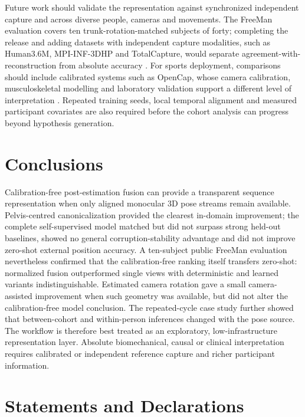 \documentclass[lineno,pdflatex,sn-mathphys-num]{sn-jnl}
\begin{document}
Future work should validate the representation against synchronized
independent capture and across diverse people, cameras and movements. The
FreeMan evaluation covers ten trunk-rotation-matched subjects of forty;
completing the release and adding datasets with independent capture
modalities, such as Human3.6M, MPI-INF-3DHP and TotalCapture, would separate
agreement-with-reconstruction from absolute accuracy
\cite{Ionescu2014Human36M,Mehta2017MPIINF3DHP,Trumble2017TotalCapture}.
For sports deployment, comparisons should include calibrated systems such as
OpenCap, whose camera calibration, musculoskeletal modelling and laboratory
validation support a different level of interpretation \cite{Uhlrich2023OpenCap}.
Repeated training seeds, local temporal alignment and measured participant
covariates are also required before the cohort analysis can progress beyond
hypothesis generation.

\section{Conclusions}\label{sec:conclusion}

Calibration-free post-estimation fusion can provide a transparent sequence
representation when only aligned monocular 3D pose streams remain available.
Pelvis-centred canonicalization provided the clearest in-domain improvement;
the complete self-supervised model matched but did not surpass strong held-out
baselines, showed no general corruption-stability advantage and did not
improve zero-shot external position accuracy. A ten-subject public FreeMan
evaluation nevertheless confirmed that the calibration-free ranking itself
transfers zero-shot: normalized fusion outperformed single views with
deterministic and learned variants indistinguishable. Estimated camera
rotation gave a small
camera-assisted improvement when such geometry was available, but did not
alter the calibration-free model conclusion. The repeated-cycle case study further
showed that between-cohort and within-person inferences changed with the pose
source. The workflow is therefore best treated as an exploratory,
low-infrastructure representation layer. Absolute biomechanical, causal or
clinical interpretation requires calibrated or independent reference capture
and richer participant information.



\section*{Statements and Declarations}
\end{document}
